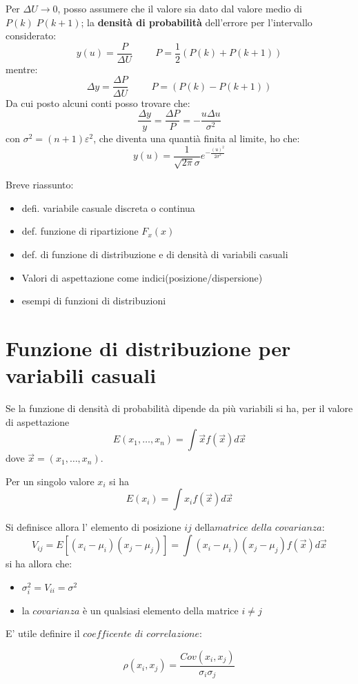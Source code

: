 \documentclass{article}
\begin{document}
Per $\Delta U \rightarrow 0$, posso assumere che il valore sia dato dal valore medio di $P(k) \; P(k+1)$; 
la \textbf{densità di probabilità} dell'errore per l'intervallo considerato:
\[
y(u)=\frac{P}{\Delta U} \hspace{1cm } P= \frac{1}{2}(P(k) + P(k+1))
\]
mentre:
\[
\Delta y = \frac{\Delta P}{\Delta U} \hspace{1cm } P= (P(k) - P(k+1))
\]
Da cui posto alcuni conti posso trovare che:
\[
\frac{\Delta y}{y}=\frac{\Delta P}{P}= -\frac{u \Delta u}{\sigma^2}
\]
con $\sigma^2=(n+1)\varepsilon^2$, che diventa una quantià finita al limite, ho che:
\[
    y(u)=\frac{1}{\sqrt{2\pi} \sigma}e^{-\frac{(u)^2}{2 \sigma^2}}
\]

Breve riassunto:
\begin{itemize}[itemsep=0.3em]
    \item defi. variabile casuale discreta o continua
    \item def. funzione di ripartizione $F_x(x)$
    \item def. di funzione di distribuzione e di densità di variabili casuali
    \item Valori di aspettazione come indici(posizione/dispersione)
    \item esempi di funzioni di distribuzioni
\end{itemize}


\section{Funzione di distribuzione per variabili casuali}
Se la funzione di densità di probabilità dipende da più variabili si ha, per il valore di aspettazione
\[
E(x_1, \ldots, x_n) = \int \vec {x}f(\vec{x})d\vec{x}
\]
dove $\vec{x}=(x_1, \ldots, x_n)$.

Per un singolo valore $x_i$ si ha
\[
E(x_i) = \int x_i f(\vec{x}) d\vec{x}
\]

Si definisce allora l' elemento di posizione  $ij$ della$matrice$ $della$ $covarianza$:
\[
V_{ij}=E[(x_i-\mu_i)(x_j-\mu_j)]=\int (x_i-\mu_i)(x_j-\mu_j)f(\vec{x}) d\vec{x}
\]
si ha allora che:
\begin{itemize}
    \item $\sigma_i^2=V_{ii}=\sigma^2$
    \item la $covarianza$ è un qualsiasi elemento della matrice $i\neq j$
\end{itemize}
E' utile definire il $coefficente$ $di$ $correlazione$:

\[\rho(x_i,x_j)=\frac{Cov(x_i,x_j)}{\sigma_i \sigma_j}\]
\end{document}
